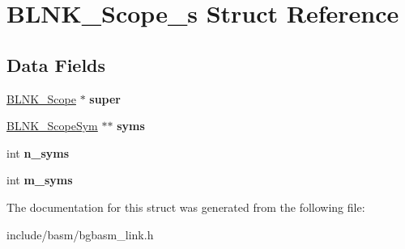 \hypertarget{structBLNK__Scope__s}{\section{B\-L\-N\-K\-\_\-\-Scope\-\_\-s Struct Reference}
\label{structBLNK__Scope__s}
}
\subsection*{Data Fields}
\begin{DoxyCompactItemize}
\item 
\hypertarget{structBLNK__Scope__s_a64714c535c976064cba3ab30af1a62a6}{\hyperlink{structBLNK__Scope__s}{B\-L\-N\-K\-\_\-\-Scope} $\ast$ {\bfseries super}}\label{structBLNK__Scope__s_a64714c535c976064cba3ab30af1a62a6}

\item 
\hypertarget{structBLNK__Scope__s_aaf8fd208dea423e287dd3a9ab044709b}{\hyperlink{structBLNK__ScopeSym__s}{B\-L\-N\-K\-\_\-\-Scope\-Sym} $\ast$$\ast$ {\bfseries syms}}\label{structBLNK__Scope__s_aaf8fd208dea423e287dd3a9ab044709b}

\item 
\hypertarget{structBLNK__Scope__s_ac884e50ff26481c935b81bc76d246116}{int {\bfseries n\-\_\-syms}}\label{structBLNK__Scope__s_ac884e50ff26481c935b81bc76d246116}

\item 
\hypertarget{structBLNK__Scope__s_a5d079c3014443659d79e398950abdf4b}{int {\bfseries m\-\_\-syms}}\label{structBLNK__Scope__s_a5d079c3014443659d79e398950abdf4b}

\end{DoxyCompactItemize}


The documentation for this struct was generated from the following file\-:\begin{DoxyCompactItemize}
\item 
include/basm/bgbasm\-\_\-link.\-h\end{DoxyCompactItemize}
